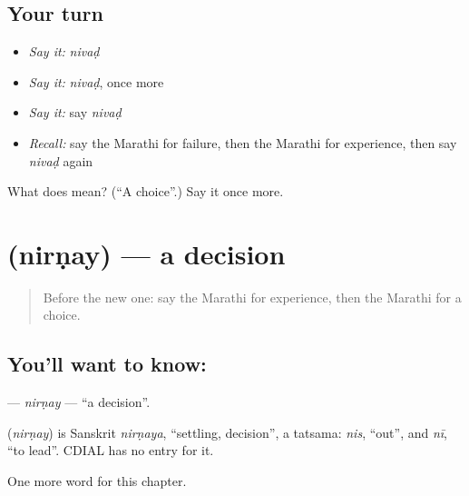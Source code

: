 \subsection*{Your turn}
\begin{itemize}
\raggedright
  \item \emph{Say it:} \emph{nivaḍ}
  \item \emph{Say it:} \emph{nivaḍ}, once more
  \item \emph{Say it:} say \emph{nivaḍ}
  \item \emph{Recall:} say the Marathi for failure, then the Marathi for experience, then say \emph{nivaḍ} again
\end{itemize}

\begin{tcolorbox}[breakable,colback=teal!4,colframe=teal!35!black,title={Before you move on}]
What does  mean? (\textquotedblleft{}A choice\textquotedblright{}.) Say it once more.
\end{tcolorbox}
\section[\texorpdfstring{\mr{निर्णय} (nirṇay)}{निर्णय (nirṇay)}]{ (nirṇay) — a decision}

\label{lesson:MR-C211-nirnay}



\begin{quote}
Before the new one: say the Marathi for experience, then the Marathi for a choice.
\end{quote}

\subsection*{You'll want to know: }
\textbf{} — \emph{nirṇay} — \textquotedblleft{}a decision\textquotedblright{}.

\begin{cousinweb}
\textbf{} (\emph{nirṇay}) is Sanskrit \emph{nirṇaya}, \textquotedblleft{}settling, decision\textquotedblright{}, a tatsama: \emph{nis}, \textquotedblleft{}out\textquotedblright{}, and \emph{nī}, \textquotedblleft{}to lead\textquotedblright{}. CDIAL has no entry for it.
\end{cousinweb}

\begin{grammarlens}[title={What you've built}]
One more word for this chapter.
\end{grammarlens}

